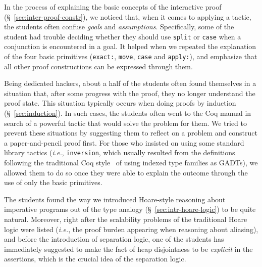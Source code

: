 \documentclass[blockstyle,preprint]{sigplanconf}
\newcommand{\code}[1]{\lstinline{#1}}
\newcommand{\ie}{\emph{i.e.}\xspace}
\begin{document}
In the process of explaining the basic concepts of the interactive
proof (\S~\ref{sec:inter-proof-constr}), we noticed that, when it
comes to applying a tactic, the students often confuse \emph{goals}
and \emph{assumptions}. Specifically, some of the student had trouble
deciding whether they should use \code{split} or \code{case} when a
conjunction is encountered in a goal. It helped when we repeated the
explanation of the four basic primitives (\code{exact:}, \code{move},
\code{case} and \code{apply:}), and emphasize that all other proof
constructions can be expressed through them.


Being dedicated hackers, about a half of the students often found
themselves in a situation that, after some progress with the proof,
they no longer understand the proof state. This situation typically
occurs when doing proofs by induction (\S~\ref{sec:induction}). In
such cases, the students often went to the Coq manual in search of a
powerful tactic that would solve the problem for them. We tried to
prevent these situations by suggesting them to reflect on a problem
and construct a paper-and-pencil proof first. For those who insisted
on using some standard library tactics (\ie, \code{inversion}, which
usually resulted from the definitions following the traditional Coq
style~\cite{Chlipala:BOOK,Pierce-al:SF} of using indexed type families
as GADTs), we allowed them to do so once they were able to explain the
outcome through the use of only the basic primitives.

The students found the way we introduced Hoare-style reasoning about
imperative programs out of the type analogy
(\S~\ref{sec:intr-hoare-logic}) to be quite natural. Moreover, right
after the scalability problems of the traditional Hoare logic were
listed (\ie, the proof burden appearing when reasoning about
aliasing), and before the introduction of separation logic, one of the
students has immediately suggested to make the fact of heap
disjointness to be \emph{explicit} in the assertions, which is the
crucial idea of the separation logic.
\end{document}

